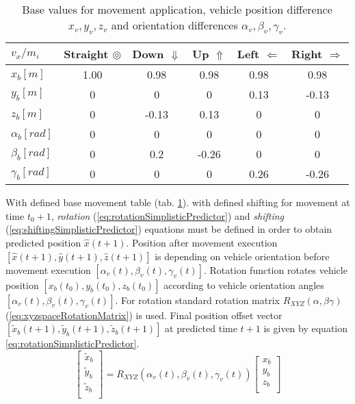 \begin{table}[H]
    \centering
    \begin{tabular}{|l||c|c|c|c|c|}
    \hline
        $v_x/m_i$           &    Straight $\circledcirc$ & Down $\Downarrow$  & Up $\Uparrow$    & Left $\Leftarrow$ & Right $\Rightarrow$\\\hline\hline
        $x_b [m]$           &    1.00	  & 0.98  & 0.98  & 0.98 & 0.98\\\hline
        $y_b [m]$           &    0	      & 0	  & 0	  & 0.13 & -0.13\\\hline
        $z_b [m]$           &    0	      & -0.13 & 0.13  &	0	 & 0\\\hline
        $\alpha_b [rad]$	&    0	      & 0	  & 0	  & 0    & 0\\\hline
        $\beta_b [rad]$     &    0	      & 0.2   & -0.26 & 0	 & 0\\\hline
        $\gamma_b [rad]$    &    0	      & 0	  & 0	  & 0.26 & -0.26\\\hline
    \end{tabular}
    \caption{Base values for movement application, vehicle position difference $x_v,y_v,z_v$ and orientation differences $\alpha_v,\beta_v,\gamma_v$.}
    \label{tab:movementPredictor}
\end{table}
\noindent With defined base movement table (tab. \ref{tab:movementPredictor}). with defined shifting for movement at time $t_0+1$, \textit{rotation} (\ref{eq:rotationSimplisticPredictor}) and \textit{shifting} (\ref{eq:shiftingSimplisticPredictor}) equations must be defined in order to obtain predicted position $\hat{x}(t+1)$. Position after movement execution $[\hat{x}(t+1),\hat{y}(t+1),\hat{z}(t+1)]$ is depending on vehicle orientation before movement execution $[\alpha_v(t),\beta_v(t),\gamma_v(t)]$. Rotation function rotates vehicle position $[x_b(t_0),y_b(t_0),z_b(t_0)]$ according to vehicle orientation angles $[\alpha_v(t),\beta_v(t),\gamma_v(t)]$. For rotation standard rotation matrix $R_{XYZ}(\alpha,\beta\gamma)$ (\ref{eq:xyzspaceRotationMatrix}) is used. Final position offset vector $[\tilde{x}_b(t+1),\tilde{y}_b(t+1),\tilde{z}_b(t+1)]$ at predicted time $t+1$ is given by equation \ref{eq:rotationSimplisticPredictor}.
\begin{equation}\label{eq:rotationSimplisticPredictor}
    \begin{bmatrix}
        \tilde{x}_b\\ 
        \tilde{y}_b\\
        \tilde{z}_b\\
    \end{bmatrix}
    = R_{XYZ}(\alpha_v(t),\beta_v(t),\gamma_v(t))
    \begin{bmatrix}
        x_b\\ 
        y_b\\
        z_b\\
    \end{bmatrix}
\end{equation}
